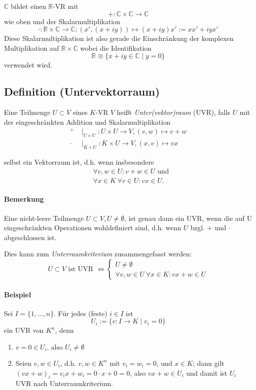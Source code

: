 	$\mathbb{C}$ bildet einen $\mathbb{R}$-VR mit
		\[ +:\mathbb{C}\times\mathbb{C}\to\mathbb{C} \]
	wie oben und der Skalarmultiplikation
		\[ \cdot:\mathbb{R}\times\mathbb{C}\to\mathbb{C}:(x',(x+iy))\mapsto(x+iy)x':=xx'+iyx' \]
	Diese Skalarmultiplikation ist also gerade die Einschränkung der komplexen Multiplikation auf $\mathbb{R}\times\mathbb{C}$ wobei die Identifikation
		\[ \mathbb{R}\cong \{{x+iy\in\mathbb{C}\mid y=0}\} \]
	verwendet wird.
	
\subsection{Definition (Untervektorraum)}
	\begin{Definition}[Untervektorraum]
		Eine Teilmenge $U\subset V$ eines $K$-VR $V$ heißt \emph{Unter(vektor)raum} (UVR), falls $U$ mit der eingeschränkten Addition und Skalarmultiplikation
	\begin{align*}
		 ^+    & \mid_{U\times U}: U\times U \to V,(v,w) \mapsto v+w \\
		 \cdot & \mid_{K\times U}: K\times U \to V,(x,v) \mapsto vx
	\end{align*}

	selbst ein Vektorraum ist, d.h. wenn insbesondere
	\begin{align*}
		&\forall v,w \in U: v+w\in U \text{ und}\\
		&\forall x\in K\ \forall v\in U: vx\in U.
	\end{align*}
	\end{Definition}

\paragraph{Bemerkung}
	Eine nicht-leere Teilmenge $U\subset V, U\neq\emptyset$, ist genau dann ein UVR, wenn die auf U eingeschränkten Operationen wohldefiniert sind, d.h. wenn $ U $ bzgl. $ + $ und $ \cdot $ abgeschlossen ist.

	Dies kann zum \emph{Unterraumkriterium} zusammengefasst werden:
	\begin{equation*}
		U\subset V \text{ ist UVR }\Leftrightarrow 
 		 \begin{cases}
 		 	U\neq\emptyset\\
 		 	\forall v,w\in U\ \forall x\in K: vx+w\in U
 		 \end{cases}
	\end{equation*}

\paragraph{Beispiel}
	Sei $I=\{1,...,n\}$. Für jedes (feste) $i\in I$ ist
		\[ U_i := \{v:I\to K\mid v_i =0\} \]
	ein UVR von $K^n$, denn
	\begin{enumerate}
		\item $v = 0 \in U_i\text{, also } U_i \neq \emptyset$
		\item Seien $v,w\in U_i$, d.h. $v,w\in K^n$ mit $v_i =w_i =0$, und $x\in K$; dann gilt $(vx+w)_i = v_ix+ w_i = 0\cdot x + 0 = 0$, also $vx+w\in U_i$ und damit ist $U_i$ UVR nach Unterraumkriterium.  
	\end{enumerate}
	
